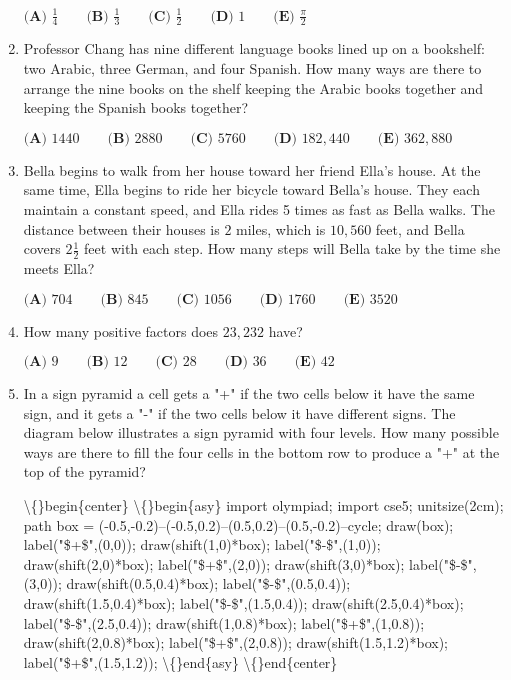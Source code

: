 \documentclass{article}
\begin{document}
\begin{enumerate}[label=\arabic*., itemsep=0.5em]
\(\textbf{(A) } \frac{1}{4} \qquad \textbf{(B) } \frac{1}{3} \qquad \textbf{(C) } \frac{1}{2} \qquad \textbf{(D) } 1 \qquad \textbf{(E) } \frac{\pi}{2}\)\par \vspace{0.5em}\item Professor Chang has nine different language books lined up on a bookshelf: two Arabic, three German, and four Spanish. How many ways are there to arrange the nine books on the shelf keeping the Arabic books together and keeping the Spanish books together?

\(\textbf{(A) }1440\qquad\textbf{(B) }2880\qquad\textbf{(C) }5760\qquad\textbf{(D) }182,440\qquad \textbf{(E) }362,880\)\par \vspace{0.5em}\item Bella begins to walk from her house toward her friend Ella's house. At the same time, Ella begins to ride her bicycle toward Bella's house. They each maintain a constant speed, and Ella rides 5 times as fast as Bella walks. The distance between their houses is \(2\) miles, which is \(10,560\) feet, and Bella covers \(2 \tfrac{1}{2}\) feet with each step. How many steps will Bella take by the time she meets Ella?

\(\textbf{(A) }704\qquad\textbf{(B) }845\qquad\textbf{(C) }1056\qquad\textbf{(D) }1760\qquad \textbf{(E) }3520\)\par \vspace{0.5em}\item How many positive factors does \(23,232\) have?

\(\textbf{(A) }9\qquad\textbf{(B) }12\qquad\textbf{(C) }28\qquad\textbf{(D) }36\qquad\textbf{(E) }42\)\par \vspace{0.5em}\item In a sign pyramid a cell gets a "+" if the two cells below it have the same sign, and it gets a "-" if the two cells below it have different signs. The diagram below illustrates a sign pyramid with four levels. How many possible ways are there to fill the four cells in the bottom row to produce a "+" at the top of the pyramid?


\textbackslash\{\}begin\{center\}
\textbackslash\{\}begin\{asy\}
import olympiad;
import cse5;
unitsize(2cm);
path box = (-0.5,-0.2)--(-0.5,0.2)--(0.5,0.2)--(0.5,-0.2)--cycle;
draw(box); label("\$+\$",(0,0));
draw(shift(1,0)*box); label("\$-\$",(1,0));
draw(shift(2,0)*box); label("\$+\$",(2,0));
draw(shift(3,0)*box); label("\$-\$",(3,0));
draw(shift(0.5,0.4)*box); label("\$-\$",(0.5,0.4));
draw(shift(1.5,0.4)*box); label("\$-\$",(1.5,0.4));
draw(shift(2.5,0.4)*box); label("\$-\$",(2.5,0.4));
draw(shift(1,0.8)*box); label("\$+\$",(1,0.8));
draw(shift(2,0.8)*box); label("\$+\$",(2,0.8));
draw(shift(1.5,1.2)*box); label("\$+\$",(1.5,1.2));
\textbackslash\{\}end\{asy\}
\textbackslash\{\}end\{center\}



\end{enumerate}
\end{document}
